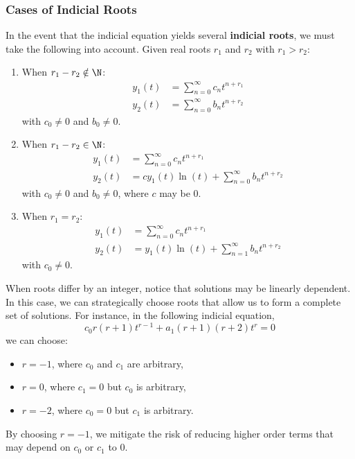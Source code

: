\documentclass{article}
\begin{document}
\subsubsection{Cases of Indicial Roots}
In the event that the indicial equation yields several \textbf{indicial roots}, we must take the following into account.
Given real roots \(r_1\) and \(r_2\) with \(r_1 > r_2\):
\begin{enumerate}
    \item When \(r_1 - r_2 \notin \N\):
          \begin{align*}
              y_1\left( t \right) & = \sum_{n = 0}^\infty c_n t^{n + r_1} \\
              y_2\left( t \right) & = \sum_{n = 0}^\infty b_n t^{n + r_2}
          \end{align*}
          with \(c_0 \neq 0\) and \(b_0 \neq 0\).
    \item When \(r_1 - r_2 \in \N\):
          \begin{align*}
              y_1\left( t \right) & = \sum_{n = 0}^\infty c_n t^{n + r_1}                                             \\
              y_2\left( t \right) & = c y_1\left( t \right) \ln\left( t \right) + \sum_{n = 0}^\infty b_n t^{n + r_2}
          \end{align*}
          with \(c_0 \neq 0\) and \(b_0 \neq 0\), where \(c\) may be 0.
    \item When \(r_1 = r_2\):
          \begin{align*}
              y_1\left( t \right) & = \sum_{n = 0}^\infty c_n t^{n + r_1}                                           \\
              y_2\left( t \right) & = y_1\left( t \right) \ln\left( t \right) + \sum_{n = 1}^\infty b_n t^{n + r_2}
          \end{align*}
          with \(c_0 \neq 0\).
\end{enumerate}
When roots differ by an integer, notice that solutions may be linearly dependent. In this case, we can
strategically choose roots that allow us to form a complete set of solutions.
For instance, in the following indicial equation,
\begin{equation*}
    c_0 r \left( r + 1 \right) t^{r - 1} + a_1 \left( r + 1 \right) \left( r + 2 \right) t^r = 0
\end{equation*}
we can choose:
\begin{itemize}
    \item \(r = -1\), where \(c_0\) and \(c_1\) are arbitrary,
    \item \(r = 0\), where \(c_1 = 0\) but \(c_0\) is arbitrary,
    \item \(r = -2\), where \(c_0 = 0\) but \(c_1\) is arbitrary.
\end{itemize}
By choosing \(r = -1\), we mitigate the risk of reducing higher order terms that may depend on \(c_0\) or \(c_1\) to 0.
\end{document}
